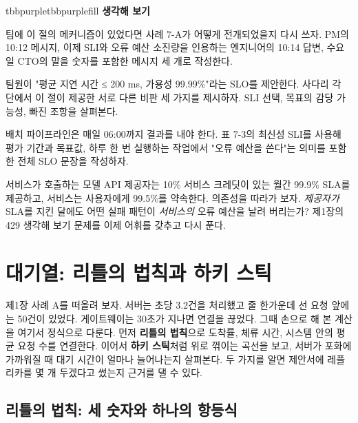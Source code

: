 \vspace{3.0pt}

\begin{calloutbox}{tbbpurple}{tbbpurplefill}
{\normalsize\bfseries\color{tbbpurple}생각해 보기}\par\vspace{3pt}
\begin{tbbitemize}
  \item 팀에 이 절의 메커니즘이 있었다면 사례 7-A가 어떻게 전개되었을지 다시 쓰자. PM의 10:12 메시지, 이제 SLI와 오류 예산 소진량을 인용하는 엔지니어의 10:14 답변, 수요일 CTO의 말을 숫자를 포함한 메시지 세 개로 작성한다.
  \item 팀원이 "평균 지연 시간 ≤ 200 ms, 가용성 99.99\%"라는 SLO를 제안한다. 사다리 각 단에서 이 절이 제공한 서로 다른 비판 세 가지를 제시하자. SLI 선택, 목표의 감당 가능성, 빠진 조항을 살펴본다.
  \item 배치 파이프라인은 매일 06:00까지 결과를 내야 한다. 표 7-3의 최신성 SLI를 사용해 평가 기간과 목표값, 하루 한 번 실행하는 작업에서 "오류 예산을 쓴다"는 의미를 포함한 전체 SLO 문장을 작성하자.
  \item 서비스가 호출하는 모델 API 제공자는 10\% 서비스 크레딧이 있는 월간 99.9\% SLA를 제공하고, 서비스는 사용자에게 99.5\%를 약속한다. 의존성을 따라가 보자. \textit{제공자가} SLA를 지킨 달에도 어떤 실패 패턴이 \textit{서비스의} 오류 예산을 날려 버리는가? 제1장의 429 생각해 보기 문제를 이제 어휘를 갖추고 다시 푼다.
\end{tbbitemize}
\end{calloutbox}

\section{대기열: 리틀의 법칙과 하키 스틱}

제1장 사례 A를 떠올려 보자. 서버는 초당 3.2건을 처리했고 줄 한가운데 선 요청 앞에는 50건이 있었다. 게이트웨이는 30초가 지나면 연결을 끊었다. 그때 손으로 해 본 계산을 여기서 정식으로 다룬다. 먼저 \textbf{리틀의 법칙}으로 도착률, 체류 시간, 시스템 안의 평균 요청 수를 연결한다. 이어서 \textbf{하키 스틱}처럼 위로 꺾이는 곡선을 보고, 서버가 포화에 가까워질 때 대기 시간이 얼마나 늘어나는지 살펴본다. 두 가지를 알면 제안서에 레플리카를 몇 개 두겠다고 썼는지 근거를 댈 수 있다.

\subsection*{리틀의 법칙: 세 숫자와 하나의 항등식}

